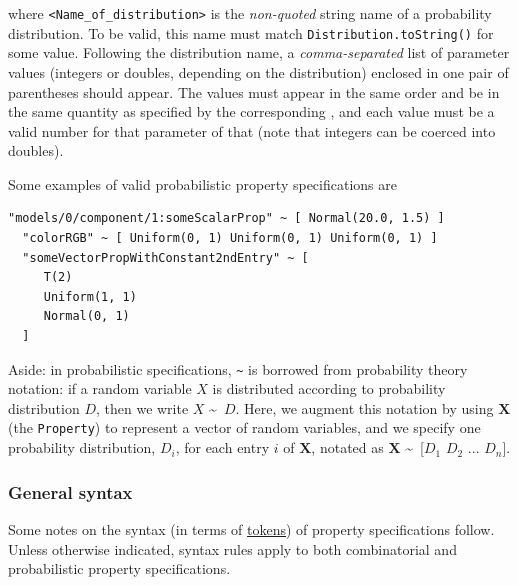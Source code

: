 \documentclass{article}
\begin{document}
where {\tt <Name\_of\_distribution>} is the \textit{non-quoted} string name of a probability distribution. To be valid, this name must match {\tt Distribution.toString()} for some  value. Following the distribution name, a \textit{comma-separated} list of parameter values (integers or doubles, depending on the distribution) enclosed in one pair of parentheses should appear. The values must appear in the same order and be in the same quantity as specified by the corresponding , and each value must be a valid number for that parameter of that  (note that integers can be coerced into doubles). 

Some examples of valid probabilistic property specifications are

\begin{lstlisting}[]
  "models/0/component/1:someScalarProp" ~ [ Normal(20.0, 1.5) ]
  "colorRGB" ~ [ Uniform(0, 1) Uniform(0, 1) Uniform(0, 1) ]
  "someVectorPropWithConstant2ndEntry" ~ [
     T(2)
     Uniform(1, 1)
     Normal(0, 1)
  ]
\end{lstlisting}

\begin{sideblock}
Aside: in probabilistic specifications, {\tt \textasciitilde} is borrowed from probability theory notation: if a random variable $X$ is distributed according to probability distribution $D$, then we write $X$ \textasciitilde\ $D$. Here, we augment this notation by using $\textbf{X}$ (the {\tt Property}) to represent a vector of random variables, and we specify one probability distribution, $D_i$, for each entry $i$ of $\textbf{X}$, notated as $\textbf{X}$ \textasciitilde\ [$D_1$ $D_2$ ... $D_n$].
\end{sideblock}

\subsubsection{General syntax}
\label{psl:prop-spec:general}

Some notes on the syntax (in terms of \href{https://en.wikipedia.org/wiki/Lexical_analysis#Tokenization}{tokens}) of property specifications follow. Unless otherwise indicated, syntax rules apply to both combinatorial and probabilistic property specifications.
\end{document}

